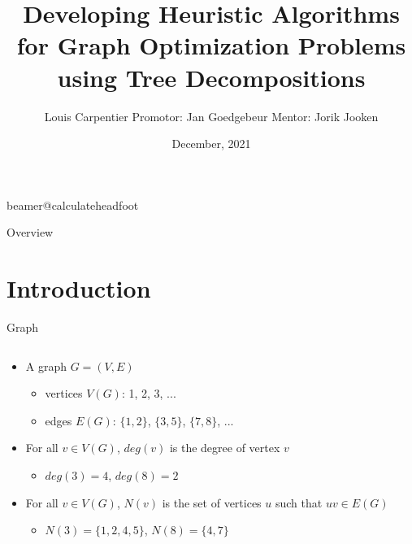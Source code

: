 \documentclass[11pt,t, usenames, dvipsnames]{beamer}
\title[Heuristic Graph Optimization using Tree Decompositions]
{\LARGE Developing Heuristic Algorithms for Graph Optimization Problems using Tree Decompositions}
\author{Louis Carpentier \newline Promotor: Jan Goedgebeur \newline Mentor: Jorik Jooken}
\institute{KU Leuven}
\date{December, 2021}
\begin{document}
\csname beamer@calculateheadfoot\endcsname 


\begin{frame}
	\titlepage
\end{frame}
	
\begin{frame}{Overview}
	\hfill{\large\parbox{.961\textwidth}{\tableofcontents[hideothersubsections]}}
\end{frame}



\section{Introduction}

\begin{frame}{Graph}
    \begin{columns}[c]
    \begin{column}{0.6\textwidth}
        \begin{itemize}
            \item<1-> A graph $G=(V,E)$
            \begin{itemize}
                \item vertices $V(G)$: 1, 2, 3, ...
                \item edges $E(G)$: $\{1,2\}$, $\{3,5\}$, $\{7,8\}$, ...
            \end{itemize}
            \item<2-> For all $v \in V(G)$, $deg(v)$ is the degree of vertex $v$
            \begin{itemize}
                \item $deg(3) = 4$, $deg(8) = 2$
            \end{itemize}
            \item<3-> For all $v \in V(G)$, $N(v)$ is the set of vertices $u$ such that $uv \in E(G)$
            \begin{itemize}
                \item $N(3) = \{1,2,4,5\}$, $N(8) = \{4,7\}$
            \end{itemize} 
        \end{itemize}
    \end{column}
    \begin{column}{0.4\textwidth} 
        \centering
\end{column}
\end{columns}
\end{frame}
\end{document}
